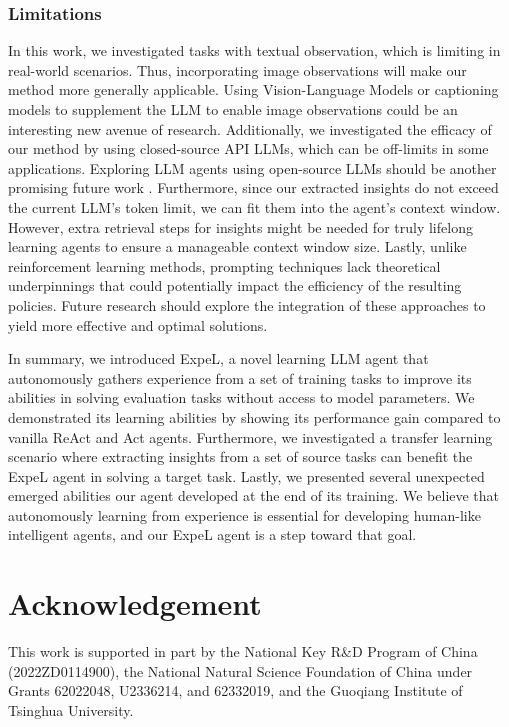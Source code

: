 \documentclass[letterpaper]{article} %
\begin{document}
\subsubsection{Limitations}
In this work, we investigated tasks with textual observation, which is limiting in real-world scenarios. Thus, incorporating image observations will make our method more generally applicable. Using Vision-Language Models or captioning models to supplement the LLM to enable image observations could be an interesting new avenue of research. Additionally, we investigated the efficacy of our method by using closed-source API LLMs, which can be off-limits in some applications. Exploring LLM agents using open-source LLMs should be another promising future work \cite{zeng2023agenttuning}. Furthermore, since our extracted insights do not exceed the current LLM's token limit, we can fit them into the agent's context window. However, extra retrieval steps for insights might be needed for truly lifelong learning agents to ensure a manageable context window size. Lastly, unlike reinforcement learning methods, prompting techniques lack theoretical underpinnings that could potentially impact the efficiency of the resulting policies. Future research should explore the integration of these approaches to yield more effective and optimal solutions.

In summary, we introduced ExpeL, a novel learning LLM agent that autonomously gathers experience from a set of training tasks to improve its abilities in solving evaluation tasks without access to model parameters. We demonstrated its learning abilities by showing its performance gain compared to vanilla ReAct and Act agents. Furthermore, we investigated a transfer learning scenario where extracting insights from a set of source tasks can benefit the ExpeL agent in solving a target task. Lastly, we presented several unexpected emerged abilities our agent developed at the end of its training. We believe that autonomously learning from experience is essential for developing human-like intelligent agents, and our ExpeL agent is a step toward that goal.


\section*{Acknowledgement}
This work is supported in part by the National Key R\&D Program of China
(2022ZD0114900), the National Natural Science Foundation of China under Grants 62022048, U2336214, and 62332019, and the Guoqiang Institute of Tsinghua University.
\end{document}
